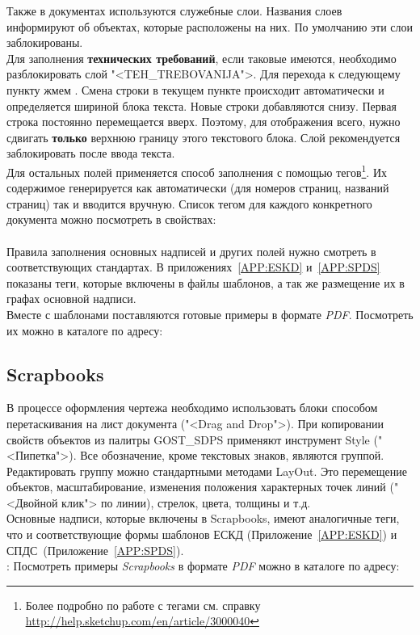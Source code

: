 \documentclass[oneside,final,14pt]{extreport}
\begin{document}
Также в документах используются служебные слои. Названия слоев информируют об объектах, которые расположены на них. По умолчанию эти слои заблокированы.\\
Для заполнения \textbf{технических требований}, если таковые имеются, необходимо разблокировать слой "<\textsf{TEH\_TREBOVANIJA}">. Для перехода к следующему пункту жмем \keys{\enter}. Смена строки в текущем пункте происходит автоматически и определяется шириной блока текста.
Новые строки добавляются снизу. Первая  строка постоянно перемещается вверх.  Поэтому, для отображения всего, нужно сдвигать \textbf{только} верхнюю границу этого текстового блока. Слой рекомендуется заблокировать после ввода текста.\\

Для остальных полей применяется способ заполнения с помощью тегов\footnote{Более подробно по работе с тегами см. справку \href{http://help.sketchup.com/en/article/3000040}{\uline{http://help.sketchup.com/en/article/3000040}}}. Их содержимое генерируется как автоматически (для номеров страниц, названий страниц) так и вводится вручную. Список тегом для каждого конкретного документа можно посмотреть в свойствах:\\

\noindent
{}\\

Правила заполнения основных надписей и других полей нужно смотреть в соответствующих стандартах. В приложениях~\ref{APP:ESKD} и~\ref{APP:SPDS} показаны теги, которые включены в файлы шаблонов, а так же размещение их в графах основной надписи.\\

Вместе с шаблонами поставляются готовые примеры в формате \emph{PDF}. Посмотреть их можно в каталоге по адресу:\\

\noindent
{}

\subsection{Scrapbooks}
В процессе оформления чертежа необходимо использовать блоки способом перетаскивания на лист документа ("<Drag and Drop">). При копировании свойств объектов из палитры \textsf{GOST\_SDPS} применяют инструмент \textsf{Style} ("<Пипетка">).
Все обозначение, кроме текстовых знаков, являются группой. Редактировать группу можно стандартными методами LayOut. Это перемещение объектов, масштабирование, изменения положения характерных точек линий ("<Двойной клик"> по линии), стрелок, цвета, толщины и т.д.\\
Основные надписи, которые включены в Scrapbooks, имеют аналогичные теги, что и соответствующие формы шаблонов ЕСКД (Приложение~\ref{APP:ESKD}) и СПДС~(Приложение~\ref{APP:SPDS}).\\
:
Посмотреть примеры \textit{Scrapbooks} в формате \emph{PDF} можно в каталоге по адресу:\\
\end{document}
